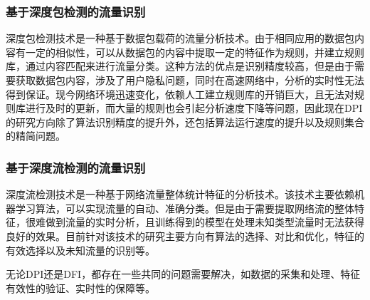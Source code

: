 \documentclass[a4papper]{article}
\begin{document}
\subsubsection{基于深度包检测的流量识别}
\par\setlength{\parindent}{2em} %
深度包检测技术是一种基于数据包载荷的流量分析技术。由于相同应用的数据包内容有一定的相似性，可以从数据包的内容中提取一定的特征作为规则，并建立规则库，通过内容匹配来进行流量分类。这种方法的优点是识别精度较高，但是由于需要获取数据包内容，涉及了用户隐私问题，同时在高速网络中，分析的实时性无法得到保证。现今网络环境迅速变化，依赖人工建立规则库的开销巨大，且无法对规则库进行及时的更新，而大量的规则也会引起分析速度下降等问题，因此现在DPI的研究方向除了算法识别精度的提升外，还包括算法运行速度的提升以及规则集合的精简问题。
\subsubsection{基于深度流检测的流量识别}
\par\setlength{\parindent}{2em} %
深度流检测技术是一种基于网络流量整体统计特征的分析技术。该技术主要依赖机器学习算法，可以实现流量的自动、准确分类。但是由于需要提取网络流的整体特征，很难做到流量的实时分析，且训练得到的模型在处理未知类型流量时无法获得良好的效果。目前针对该技术的研究主要方向有算法的选择、对比和优化，特征的有效选择以及未知流量的识别等。
\par\setlength{\parindent}{2em} %
无论DPI还是DFI，都存在一些共同的问题需要解决，如数据的采集和处理、特征有效性的验证、实时性的保障等。
\end{document}
